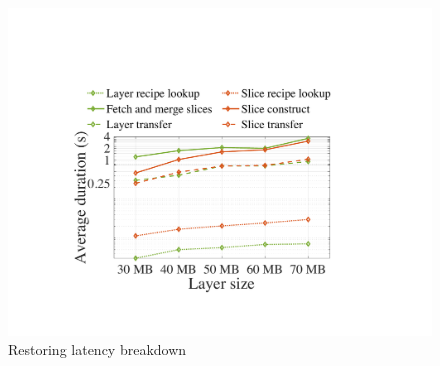 \begin{figure}[t]
	\hspace{1mm}
	\begin{minipage}{0.3\textwidth}
	\centering
	\includegraphics[width=\textwidth]{graphs/restoringbreakdown.pdf}
	\caption{Restoring latency breakdown}
	\label{fig:eval-restoringbreakdown}
	\end{minipage}
\end{figure}

